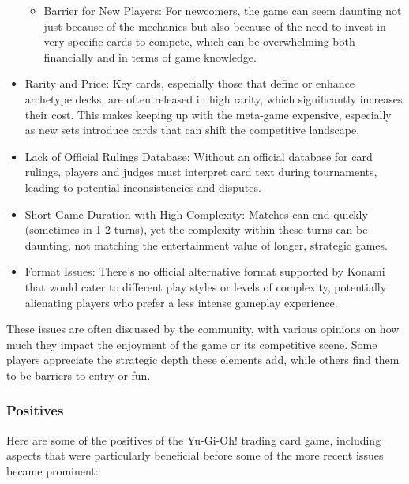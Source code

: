 \begin{itemize}
\begin{itemize}
			  \item Barrier for New Players: For newcomers, the game can seem daunting not just because of the mechanics but also because of the need to invest in very specific cards to compete, which can be overwhelming both financially and in terms of game knowledge.
		  \end{itemize}
	\item Rarity and Price: Key cards, especially those that define or enhance archetype decks, are often released in high rarity, which significantly increases their cost. This makes keeping up with the meta-game expensive, especially as new sets introduce cards that can shift the competitive landscape.
	\item Lack of Official Rulings Database: Without an official database for card rulings, players and judges must interpret card text during tournaments, leading to potential inconsistencies and disputes.
	\item Short Game Duration with High Complexity: Matches can end quickly (sometimes in 1-2 turns), yet the complexity within these turns can be daunting, not matching the entertainment value of longer, strategic games.
	\item Format Issues: There's no official alternative format supported by Konami that would cater to different play styles or levels of complexity, potentially alienating players who prefer a less intense gameplay experience.
\end{itemize}

These issues are often discussed by the community, with various opinions on how much they impact the enjoyment of the game or its competitive scene. Some players appreciate the strategic depth these elements add, while others find them to be barriers to entry or fun.

\subsubsection{Positives}

Here are some of the positives of the Yu-Gi-Oh! trading card game, including aspects that were particularly beneficial before some of the more recent issues became prominent:

